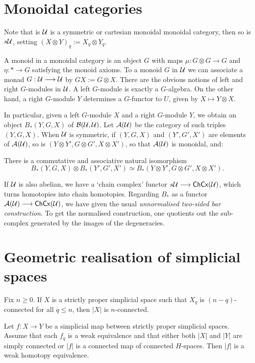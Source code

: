 \documentclass[11pt]{article}
\begin{document}
\begin{chapter10-12}
\setcounter{section}{9}
\section{Monoidal categories}
Note that is $\mathcal{U}$ is a symmetric or cartesian monoidal monoidal category, then so is $s\mathcal{U}$, setting $(X\otimes Y)_q:=X_q\otimes Y_q$. 

A monoid in a monoidal category is an object $G$ with maps $\mu:G\otimes G\to G$ and $\eta:*\to G$ satisfying the monoid axioms. To a monoid $G$ in $\mathcal{U}$ we can associate a monad $G:\mathcal{U}\longrightarrow \mathcal{U}$ by $GX:=G\otimes X$. There are the obvious notions of left and right $G$-modules in $\mathcal{U}$. A left $G$-module is exactly a $G$-algebra. On the other hand, a right $G$-module $Y$ determines a $G$-functor to $U$, given by $X\mapsto Y\otimes X$.

In particular, given a left $G$-module $X$ and a right $G$-module $Y$, we obtain an object $B_*(Y,G,X)$ of $\mathcal{B}(\mathcal{U},\mathcal{U})$. Let $\mathcal{A}(\mathcal{U})$ be the category of such triples $(Y,G,X)$. When $\mathcal{U}$ is symmetric, if $(Y,G,X)$ and $(Y',G',X')$ are elements of $\mathcal{A}(\mathcal{U})$, so is $(Y\otimes Y',G\otimes G',X\otimes X')$, so that $\mathcal{A}(\mathcal{U})$ is monoidal, and:
\begin{lem*}[10.1]
There is a commutative and associative natural isomorphism
\[B_*(Y,G,X)\otimes B_*(Y',G',X')\simeq B_*(Y\otimes Y',G\otimes G',X\otimes X').\]
\end{lem*}
\begin{rmk*}
If $\mathcal{U}$ is also abelian, we have a `chain complex' functor $s\mathcal{U}\longrightarrow\mathsf{ChCx}(\mathcal{U})$, which turns homotopies into chain homotopies. Regarding $B_*$ as a functor $\mathcal{A}(\mathcal{U})\longrightarrow \mathsf{ChCx}(\mathcal{U})$, we have given the usual \emph{unnormalised two-sided bar construction}. To get the normalised construction, one quotients out the sub-complex generated by the images of the degeneracies.
\end{rmk*}
\setcounter{section}{10}
\section{Geometric realisation of simplicial spaces}
\begin{thm*}[11.12]
Fix $n\geq0$. If $X$ is a strictly proper simplicial space such that $X_q$ is $(n-q)$-connected for all $q\leq n$, then $|X|$ is $n$-connected.
\end{thm*}
\begin{thm*}[11.13]
Let $f:X\to Y$ be a simplicial map between strictly proper simplicial spaces. Assume that each $f_q$ is a weak equivalence and that either both $|X|$ and $|Y|$ are simply connected or $|f|$ is a connected map of connected $H$-spaces. Then $|f|$ is a weak homotopy equivalence.
\end{thm*}
\setcounter{section}{11}

\end{chapter10-12}
\end{document}
